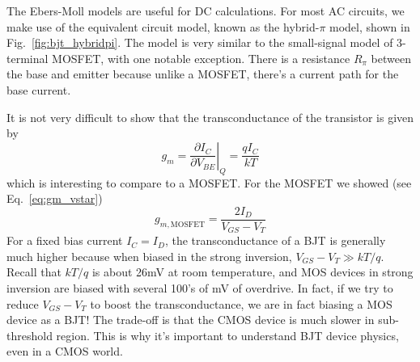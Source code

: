 The Ebers-Moll models are useful for DC calculations.  For most AC circuits, we make use of the equivalent circuit model, known as the hybrid-$\pi$ model, shown in Fig.~\ref{fig:bjt_hybridpi}.  The model is very similar to the small-signal model of 3-terminal MOSFET, with one notable exception.  There is a resistance $R_\pi$ between the base and emitter because unlike a MOSFET, there's a current path for the base current.  

It is not very difficult to show that the transconductance of the transistor is given by
%
\begin{equation}
	g_m = \left. \frac{\partial I_C}{\partial V_{BE}} \right|_Q =  \frac{qI_C}{kT}
\end{equation}
%
which is interesting to compare to a MOSFET.  For the MOSFET we showed (see Eq.~\ref{eq:gm_vstar})
%
\begin{equation}
	g_{m,\text{MOSFET}} = \frac{2 I_D}{V_{GS} - V_T}
\end{equation}
%
For a fixed bias current $I_C = I_D$, the transconductance of a BJT is generally much higher because when biased in the strong inversion, $V_{GS} - V_T \gg kT/q$.  Recall that $kT/q$ is about 26mV at room temperature, and MOS devices in strong inversion are biased with several 100's of mV of overdrive.  In fact, if we try to reduce $V_{GS}-V_T$ to boost the transconductance, we are in fact biasing a MOS device as a BJT!  The trade-off is that the CMOS device is much slower in sub-threshold region.  This is why it's important to understand BJT device physics, even in a CMOS world.
 
